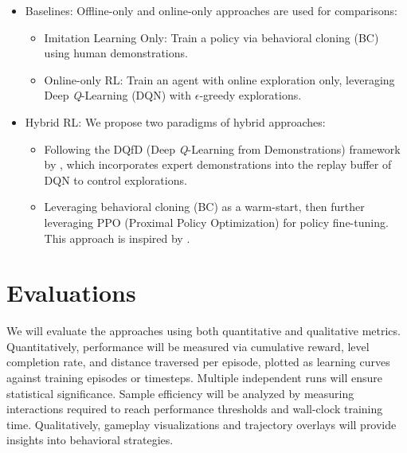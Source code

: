 \documentclass{article}
\begin{document}
\begin{itemize}
    \item Baselines: Offline-only and online-only approaches are used for 
          comparisons:
        \begin{itemize}
            \item Imitation Learning Only: Train a policy via behavioral 
                  cloning (BC) using human demonstrations.
            \item Online-only RL: Train an agent with online exploration only, 
                  leveraging Deep \textit{Q}-Learning (DQN) with $\epsilon$-greedy 
                  explorations.
        \end{itemize}
    \item Hybrid RL: We propose two paradigms of hybrid approaches:
          \begin{itemize}
            \item Following the DQfD (Deep \textit{Q}-Learning from 
                  Demonstrations) framework by \cite{hester_dqfd_2017}, which 
                  incorporates expert demonstrations into the replay buffer of 
                  DQN to control explorations.
            \item Leveraging behavioral cloning (BC) as a warm-start, then 
                  further leveraging PPO (Proximal Policy Optimization) for 
                  policy fine-tuning. This approach is inspired by 
                  \cite{Coletti2023EffectivenessOW}.
          \end{itemize}
\end{itemize}

\section{Evaluations}
We will evaluate the approaches using both quantitative and qualitative metrics. 
Quantitatively, performance will be measured via cumulative reward, level 
completion rate, and distance traversed per episode, plotted as learning curves 
against training episodes or timesteps. Multiple independent runs will ensure 
statistical significance. Sample efficiency will be analyzed by measuring 
interactions required to reach performance thresholds and wall-clock training 
time. Qualitatively, gameplay visualizations and trajectory overlays will 
provide insights into behavioral strategies.
\end{document}

